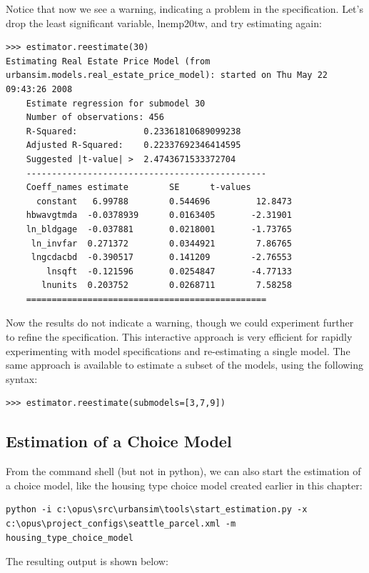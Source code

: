 Notice that now we see a warning, indicating a problem in the specification.  Let's drop the least significant variable, lnemp20tw, and try estimating again:

\begin{lstlisting}
>>> estimator.reestimate(30)
Estimating Real Estate Price Model (from urbansim.models.real_estate_price_model): started on Thu May 22 09:43:26 2008
    Estimate regression for submodel 30
    Number of observations: 456
    R-Squared:             0.23361810689099238
    Adjusted R-Squared:    0.22337692346414595
    Suggested |t-value| >  2.4743671533372704
    -----------------------------------------------
    Coeff_names estimate        SE      t-values
      constant   6.99788        0.544696         12.8473
    hbwavgtmda  -0.0378939      0.0163405       -2.31901
    ln_bldgage  -0.037881       0.0218001       -1.73765
     ln_invfar  0.271372        0.0344921        7.86765
     lngcdacbd  -0.390517       0.141209        -2.76553
        lnsqft  -0.121596       0.0254847       -4.77133
       lnunits  0.203752        0.0268711        7.58258
    ===============================================
\end{lstlisting}

Now the results do not indicate a warning, though we could experiment further to refine the specification. This interactive approach is very efficient for rapidly experimenting with model specifications and re-estimating a single model.  The same approach is available to estimate a subset of the models, using the following syntax:

\begin{lstlisting}
>>> estimator.reestimate(submodels=[3,7,9])
\end{lstlisting}

\subsection{Estimation of a Choice Model}

From the command shell (but not in python), we can also start the estimation of a choice model, like the housing type choice model created earlier in this chapter:

\begin{lstlisting}
python -i c:\opus\src\urbansim\tools\start_estimation.py -x c:\opus\project_configs\seattle_parcel.xml -m housing_type_choice_model 
\end{lstlisting}

The resulting output is shown below:

